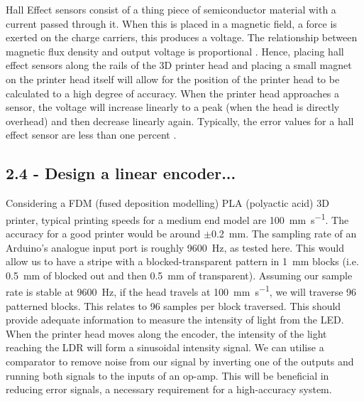 \documentclass[conference]{IEEEtran}
\begin{document}
Hall Effect sensors consist of a thing piece of semiconductor material with a current passed through it. When this is placed in a magnetic field, a force is exerted on the charge carriers, this produces a voltage. The relationship between magnetic flux density and output voltage is proportional \cite{b3}. Hence, placing hall effect sensors along the rails of the 3D printer head and placing a small magnet on the printer head itself will allow for the position of the printer head to be calculated to a high degree of accuracy. When the printer head approaches a sensor, the voltage will increase linearly to a peak (when the head is directly overhead) and then decrease linearly again. Typically, the error values for a hall effect sensor are less than one percent \cite{b4}.

\subsection*{2.4 - Design a linear encoder...}
Considering a FDM (fused deposition modelling) PLA (polyactic acid) 3D printer, typical printing speeds \cite{b1} for a medium end model are \SI{100}{\milli\meter\per\second}. The accuracy for a good printer would be around $\pm$\SI{0.2}{\milli\meter}. The sampling rate of an Arduino's analogue input port is roughly \SI{9600}{\hertz}, as tested here. This would allow us to have a stripe with a blocked-transparent pattern in \SI{1}{\milli\meter} blocks (i.e. \SI{0.5}{\milli\meter} of blocked out and then \SI{0.5}{\milli\meter} of transparent). Assuming our sample rate is stable at \SI{9600}{\hertz}, if the head travels at \SI{100}{\milli\meter\per\second}, we will traverse 96 patterned blocks. This relates to 96 samples per block traversed. This should provide adequate information to measure the intensity of light from the LED. When the printer head moves along the encoder, the intensity of the light reaching the LDR will form a sinusoidal intensity signal. We can utilise a comparator to remove noise from our signal by inverting one of the outputs and running both signals to the inputs of an op-amp. This will be beneficial in reducing error signals, a necessary requirement for a high-accuracy system. 
\end{document}
